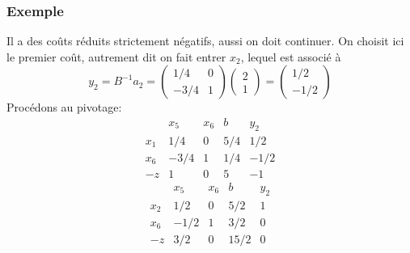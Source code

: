 \documentclass[usepdftitle=false]{beamer}
\begin{document}
\begin{frame}
\frametitle{Exemple}

Il a des coûts réduits strictement négatifs, aussi on doit continuer. On choisit ici le premier coût, autrement dit on fait entrer $x_2$, lequel est associé à
\[
y_2 = B^{-1}a_2 =
\begin{pmatrix}
1/4 & 0 \\
-3/4 & 1
\end{pmatrix}
\begin{pmatrix}
2 \\ 1
\end{pmatrix}
=
\begin{pmatrix}
1/2 \\ -1/2
\end{pmatrix}
\]
Procédons au pivotage:
\[
\begin{matrix}
    & x_5 & x_6 & b & y_2 \\
x_1 & 1/4 & 0 & 5/4 & 1/2 \\
x_6 & -3/4 & 1 & 1/4 & -1/2 \\
-z & 1 & 0 & 5 & -1
\end{matrix}
\]
\[
\begin{matrix}
    & x_5 & x_6 & b & y_2 \\
x_2 & 1/2 & 0 & 5/2 & 1 \\
x_6 & -1/2 & 1 & 3/2 & 0 \\
-z & 3/2 & 0 & 15/2 & 0
\end{matrix}
\]

\end{frame}
\end{document}

